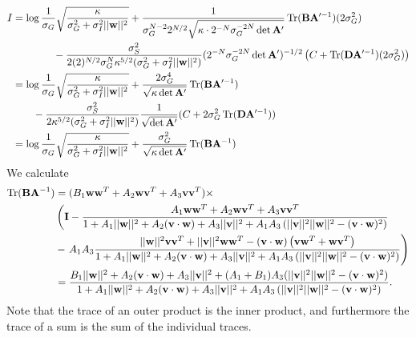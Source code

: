 \documentclass[11pt]{article}
\DeclareMathOperator{\Tr}{Tr}
\begin{document}
\begin{align}
	I &= \log \frac{1}{\sigma_G} \sqrt{\frac{\kappa}{\sigma_G^2 + \sigma_I^2 ||\mathbf{w}||^2}} +\frac{1}{\sigma_G^{N-2} 2^{N/2} \sqrt{\kappa  \cdot 2^{-N} \sigma_G^{-2N}\det \mathbf{A}'}}\Tr(\mathbf{B} \mathbf{A}'^{-1}) (2\sigma_G^2) \notag \\
	&\qquad \qquad -\frac{\sigma_S^2}{2(2)^{N/2} \sigma_G^N \kappa^{5/2} (\sigma_G^2 + \sigma_I^2 ||\mathbf{w}||^2)}(2^{-N}\sigma_G^{-2N}\det \mathbf{A}')^{-1/2} \left(C + \Tr (\mathbf{D}\mathbf{A}'^{-1}) (2\sigma_G^2)\right) \\
	&= \log \frac{1}{\sigma_G} \sqrt{\frac{\kappa}{\sigma_G^2 + \sigma_I^2 ||\mathbf{w}||^2}} + \frac{2\sigma_G^4}{\sqrt{\kappa \det \mathbf{A}'}}\Tr (\mathbf{B} \mathbf{A}'^{-1}) \notag \\
	&\qquad -\frac{\sigma_S^2}{2\kappa^{5/2} (\sigma_G^2 + \sigma_I^2 ||\mathbf{w}||^2)} \frac{1}{\sqrt{\det \mathbf{A}'}} (C + 2\sigma_G^2 \Tr (\mathbf{D}\mathbf{A}'^{-1})) \\
	&= \log \frac{1}{\sigma_G} \sqrt{\frac{\kappa}{\sigma_G^2 + \sigma_I^2 ||\mathbf{w}||^2}} + \frac{\sigma_G^2}{\sqrt{\kappa \det \mathbf{A}'}} \Tr (\mathbf{B} \mathbf{A}^{-1})
\end{align}
We calculate 
\begin{align}
	\Tr(\mathbf{B}\mathbf{A}^{-1}) &= (B_1 \mathbf{ww}^T + A_2 \mathbf{wv}^T + A_3 \mathbf{vv}^T) \times \notag \\
		& \left(\mathbf{I} - \frac{A_1 \mathbf{ww}^T + A_2 \mathbf{wv}^T + A_3 \mathbf{vv}^T}{1 + A_1 ||\mathbf{w}||^2 + A_2 (\mathbf{v}\cdot\mathbf{w}) + A_3 ||\mathbf{v}||^2 +A_1 A_3 \left(||\mathbf{v}||^2||\mathbf{w}||^2 - (\mathbf{v}\cdot\mathbf{w})^2\right)} \right.\notag \\
	&- \left. A_1 A_3\frac{||\mathbf{w}||^2 \mathbf{vv}^T + ||\mathbf{v}||^2 \mathbf{ww}^T -(\mathbf{v}\cdot \mathbf{w}) \left(\mathbf{vw}^T +\mathbf{wv}^T\right)}{1 + A_1 ||\mathbf{w}||^2 + A_2 (\mathbf{v}\cdot\mathbf{w}) + A_3 ||\mathbf{v}||^2 +A_1 A_3 \left(||\mathbf{v}||^2||\mathbf{w}||^2 - (\mathbf{v}\cdot\mathbf{w})^2\right)}\right) \\
	&= \frac{B_1 ||\mathbf{w}||^2 + A_2 (\mathbf{v}\cdot\mathbf{w}) + A_3 ||\mathbf{v}||^2 + (A_1 + B_1) A_3 (||\mathbf{v}||^2 ||\mathbf{w}||^2 - (\mathbf{v}\cdot\mathbf{w})^2)}{1 + A_1 ||\mathbf{w}||^2 + A_2 (\mathbf{v}\cdot\mathbf{w}) + A_3 ||\mathbf{v}||^2 +A_1 A_3 \left(||\mathbf{v}||^2||\mathbf{w}||^2 - (\mathbf{v}\cdot\mathbf{w})^2\right)}.
\end{align}
Note that the trace of an outer product is the inner product, and furthermore the trace of a sum is the sum of the individual traces. 
\end{document}
